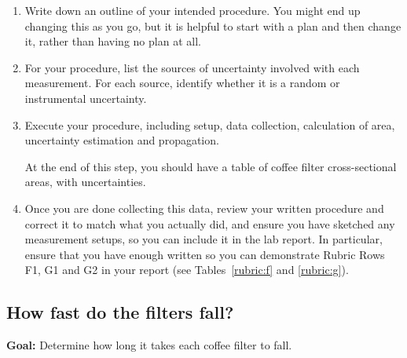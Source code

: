 \begin{enumerate}
	\item Write down an outline of your intended procedure. You might end up changing this as you go, but it is helpful to start with a plan and then change it, rather than having no plan at all.
	
	\item For your procedure, list the sources of uncertainty involved with each measurement. For each source, identify whether it is a random or instrumental uncertainty.
	
	\item Execute your procedure, including setup, data collection, calculation of area, uncertainty estimation and propagation.
	
	\begin{framed}
	At the end of this step, you should have a table of coffee filter cross-sectional areas, with uncertainties.
	\end{framed}
	
	\item Once you are done collecting this data, review your written procedure and correct it to match what you actually did, and ensure you have sketched any measurement setups, so you can include it in the lab report. In particular, ensure that you have enough written so you can demonstrate Rubric Rows F1, G1 and G2 in your report (see Tables~\ref{rubric:f} and \ref{rubric:g}).
	
\end{enumerate}

\subsection{How fast do the filters fall?}

\textbf{Goal:} Determine how long it takes each coffee filter to fall.

